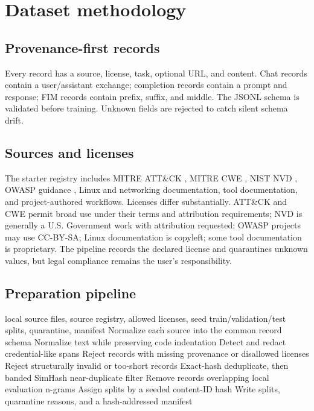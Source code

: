 \section{Dataset methodology}
\label{sec:dataset}

\subsection{Provenance-first records}

Every record has a source, license, task, optional URL, and content. Chat records
contain a user/assistant exchange; completion records contain a prompt and
response; FIM records contain prefix, suffix, and middle. The JSONL schema is
validated before training. Unknown fields are rejected to catch silent schema
drift.

\subsection{Sources and licenses}

The starter registry includes MITRE ATT\&CK \citep{mitre_attack}, MITRE CWE
\citep{mitre_cwe}, NIST NVD \citep{nist_nvd}, OWASP guidance
\citep{owasp2021}, Linux and networking documentation, tool documentation, and
project-authored workflows. Licenses differ substantially. ATT\&CK and CWE
permit broad use under their terms and attribution requirements; NVD is
generally a U.S. Government work with attribution requested; OWASP projects may
use CC-BY-SA; Linux documentation is copyleft; some tool documentation is
proprietary. The pipeline records the declared license and quarantines unknown
values, but legal compliance remains the user's responsibility.

\subsection{Preparation pipeline}

\begin{algorithm}[t]
\caption{Offline-first dataset preparation}
\label{alg:data}
\begin{algorithmic}[1]
\Require local source files, source registry, allowed licenses, seed
\Ensure train/validation/test splits, quarantine, manifest
\State Normalize each source into the common record schema
\State Normalize text while preserving code indentation
\State Detect and redact credential-like spans
\State Reject records with missing provenance or disallowed licenses
\State Reject structurally invalid or too-short records
\State Exact-hash deduplicate, then banded SimHash near-duplicate filter
\State Remove records overlapping local evaluation n-grams
\State Assign splits by a seeded content-ID hash
\State Write splits, quarantine reasons, and a hash-addressed manifest
\end{algorithmic}
\end{algorithm}

